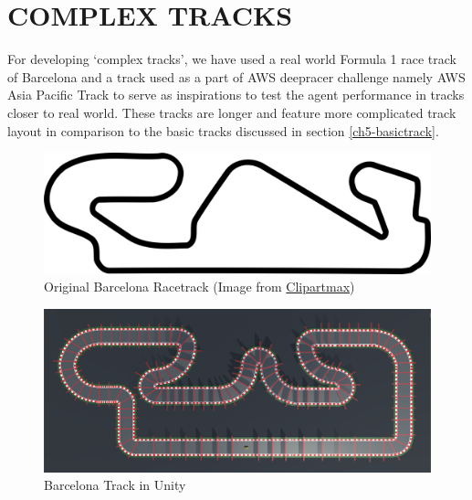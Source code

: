 \section{COMPLEX TRACKS}
%
For developing `complex tracks', we have used a real world Formula 1
race track of Barcelona and a track used as a part of AWS deepracer
challenge namely AWS Asia Pacific Track to serve as inspirations to
test the agent performance in tracks closer to real world. These
tracks are longer and feature more complicated track layout in
comparison to the basic tracks discussed in section
\ref{ch5-basictrack}.
\begin{figure}[H]
  \centering
  \includegraphics[width=1.0\textwidth]{images/tracks/BarcelonaOG.png}
  \caption{Original Barcelona Racetrack (Image from
    \href{https://www.clipartmax.com/download/m2H7G6d3Z5A0G6d3_circuit-de-barcelona-catalunya-el-circuit-restaurant-barcelona-f1-circuit-map/}{Clipartmax})}
  \label{fig:barcelona}
\end{figure}

\begin{figure}[H]
    \centering
    \includegraphics[width=1.0\textwidth]{images/tracks/Barcelona.png}
    \caption{Barcelona Track in Unity}
    \label{fig:barcelona}
\end{figure}

